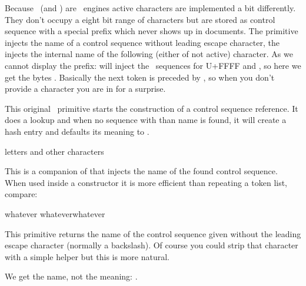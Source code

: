 \stopoldprimitive

\startnewprimitive[title={\prm {csactive}}]

Because \LUATEX\ (and \LUAMETATEX) are \UNICODE\ engines active characters are
implemented a bit differently. They don't occupy a eight bit range of characters
but are stored as control sequence with a special prefix  which
never shows up in documents. The  primitive injects the name of a
control sequence without leading escape character, the  injects
the internal name of the following (either of not active) character. As we cannot
display the prefix: \type {\csactive~} will inject the \UTF\ sequences for \type
{U+FFFF} and , so here we get the bytes . Basically
the next token is preceded by , so when you don't provide a
character you are in for a surprise.

\stopnewprimitive

\startoldprimitive[title={\prm {csname}}]

This original \TEX\ primitive starts the construction of a control sequence
reference. It does a lookup and when no sequence with than name is found, it will
create a hash entry and defaults its meaning to .

\starttyping
\csname letters and other characters\endcsname
\stoptyping

\stopoldprimitive

\startnewprimitive[title={\prm {csnamestring}}]

This is a companion of  that injects the name of the found
control sequence. When used inside a  constructor it is more
efficient than repeating a token list, compare:

\starttyping
\csname\ifcsname whatever\endcsname\csnamestring\endcsname %
\csname\ifcsname whatever\endcsname     whatever\endcsname %
\stoptyping

\stopnewprimitive

\startnewprimitive[title={\prm {csstring}}]

This primitive returns the name of the control sequence given without the leading
escape character (normally a backslash). Of course you could strip that character
with a simple helper but this is more natural.

\startbuffer
\csstring\mymacro
\stopbuffer

\typebuffer

We get the name, not the meaning: {\tt \inlinebuffer}.

